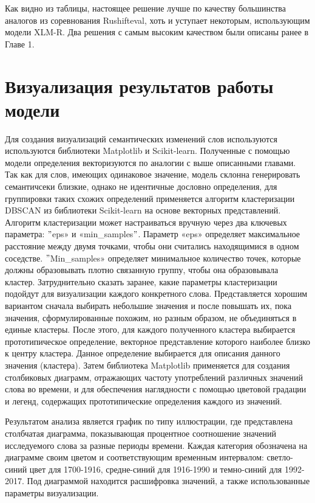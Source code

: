 \documentclass[LI,VKR]{HSEUniversity}
\begin{document}
Как видно из таблицы, настоящее решение лучше по качеству
большинства аналогов из соревнования Rushifteval,
хоть и уступает некоторым, использующим модели XLM-R.
Два решения с самым высоким качеством были описаны ранее в Главе 1.

\section{Визуализация результатов работы модели}

Для создания визуализаций семантических изменений слов используются используются библиотеки
Matplotlib и Scikit-learn.
Полученные с помощью модели определения векторизуются по аналогии с выше описанными главами.
Так как для слов, имеющих одинаковое значение,
модель склонна генерировать семантичсеки близкие, однако не идентичные дословно определения,
для группировки таких схожих определений применяется алгоритм кластеризации DBSCAN из
библиотеки Scikit-learn на основе векторных представлений.
Алгоритм кластеризации может настраиваться вручную через два ключевых параметра:
\("\)eps» и «min\_samples\("\).
Параметр «eps» определяет максимальное расстояние между двумя точками,
чтобы они считались находящимися в одном соседстве.
\("\)Min\_samples» определяет минимальное количество точек,
которые должны образовывать плотно связанную группу, чтобы она образовывала кластер.
Затруднительно сказать заранее, какие параметры кластеризации подойдут для визуализации
каждого конкретного слова.
Представляется хорошим вариантом сначала выбирать небольшие значения и после повышать их,
пока значения, сформулированные похожим, но разным образом, не объединяться в единые кластеры.
После этого, для каждого полученного кластера выбирается прототипическое определение,
векторное представление которого наиболее близко к центру кластера.
Данное определение выбирается для описания данного значения (кластера).
Затем библиотека Matplotlib применяется для создания столбиковых диаграмм,
отражающих частоту употреблений различных значений слова во времени,
и для обеспечения наглядности с помощью цветовой градации и легенд,
содержащих прототипические определения каждого из значений.

Результатом анализа является график по типу иллюстрации, где представлена столбчатая диаграмма,
показывающая процентное соотношение значений исследуемого слова за разные периоды времени.
Каждая категория обозначена на диаграмме своим цветом и соответствующим временным интервалом:
светло-синий цвет для 1700-1916, средне-синий для 1916-1990 и темно-синий для 1992-2017.
Под диаграммой находится расшифровка значений, а также использованные параметры визуализации.
\end{document}
